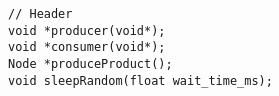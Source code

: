 \begin{lstlisting}
// Header
void *producer(void*);
void *consumer(void*);
Node *produceProduct();
void sleepRandom(float wait_time_ms);
\end{lstlisting}